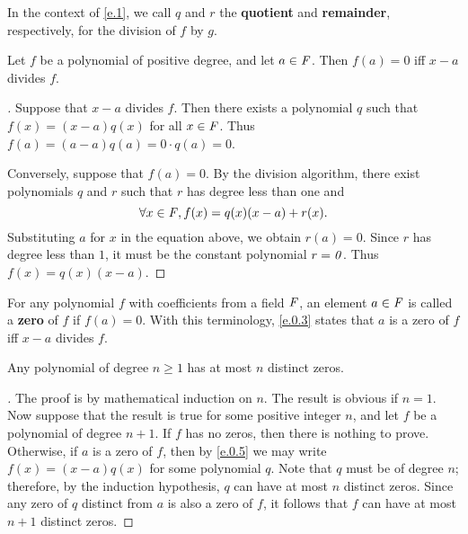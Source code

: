 \begin{defn}\label{e.0.2}
  In the context of \cref{e.1}, we call \(q\) and \(r\) the \textbf{quotient} and \textbf{remainder}, respectively, for the division of \(f\) by \(g\).
\end{defn}

\begin{cor}\label{e.0.3}
  Let \(f\) be a polynomial of positive degree, and let \(a \in \mathit{F}\).
  Then \(f(a) = 0\) iff \(x - a\) divides \(f\).
\end{cor}

\begin{proof}[]
  Suppose that \(x - a\) divides \(f\).
  Then there exists a polynomial \(q\) such that \(f(x) = (x - a) q(x)\) for all \(x \in \mathit{F}\).
  Thus \(f(a) = (a - a) q(a) = 0 \cdot q(a) = 0\).

  Conversely, suppose that \(f(a) = 0\).
  By the division algorithm, there exist polynomials \(q\) and \(r\) such that \(r\) has degree less than one and
  \[
    \forall x \in \mathit{F}, f(x) = q(x) (x - a) + r(x).
  \]
  Substituting \(a\) for \(x\) in the equation above, we obtain \(r(a) = 0\).
  Since \(r\) has degree less than \(1\), it must be the constant polynomial \(r = \mathit{0}\).
  Thus \(f(x) = q(x) (x - a)\).
\end{proof}

\begin{defn}\label{e.0.4}
  For any polynomial \(f\) with coefficients from a field \(\mathit{F}\), an element \(a \in \mathit{F}\) is called a \textbf{zero} of \(f\) if \(f(a) = 0\).
  With this terminology, \cref{e.0.3} states that \(a\) is a zero of \(f\) iff \(x - a\) divides \(f\).
\end{defn}

\begin{cor}\label{e.0.5}
  Any polynomial of degree \(n \geq 1\) has at most \(n\) distinct zeros.
\end{cor}

\begin{proof}[]
  The proof is by mathematical induction on \(n\).
  The result is obvious if \(n = 1\).
  Now suppose that the result is true for some positive integer \(n\), and let \(f\) be a polynomial of degree \(n + 1\).
  If \(f\) has no zeros, then there is nothing to prove.
  Otherwise, if \(a\) is a zero of \(f\), then by \cref{e.0.5} we may write \(f(x) = (x - a) q(x)\) for some polynomial \(q\).
  Note that \(q\) must be of degree \(n\);
  therefore, by the induction hypothesis, \(q\) can have at most \(n\) distinct zeros.
  Since any zero of \(q\) distinct from \(a\) is also a zero of \(f\), it follows that \(f\) can have at most \(n + 1\) distinct zeros.
\end{proof}


